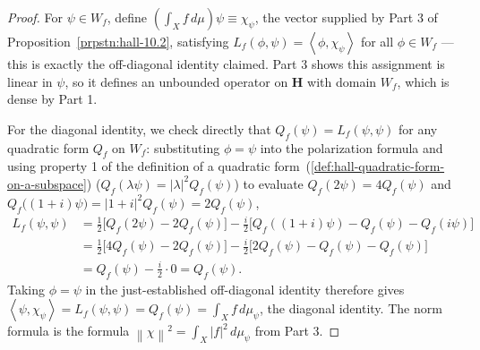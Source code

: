 \begin{proof}
    \leanok
For $\psi \in W_f$, define $\left( \int_X f \, d\mu \right) \psi \equiv \chi_\psi$, the vector supplied by Part 3 of Proposition~\ref{prpstn:hall-10.2}, satisfying $L_f(\phi, \psi) = \left< \phi, \chi_\psi \right>$ for all $\phi \in W_f$ — this is exactly the off-diagonal identity claimed. Part 3 shows this assignment is linear in $\psi$, so it defines an unbounded operator on $\mathbf{H}$ with domain $W_f$, which is dense by Part 1.

For the diagonal identity, we check directly that $Q_f(\psi) = L_f(\psi,\psi)$ for any quadratic form $Q_f$ on $W_f$: substituting $\phi = \psi$ into the polarization formula and using property 1 of the definition of a quadratic form~(\ref{def:hall-quadratic-form-on-a-subspace}) ($Q_f(\lambda\psi) = \lvert\lambda\rvert^2 Q_f(\psi)$) to evaluate $Q_f(2\psi) = 4Q_f(\psi)$ and $Q_f\big((1+i)\psi\big) = \lvert 1+i \rvert^2 Q_f(\psi) = 2Q_f(\psi)$,
\begin{align}
    L_f(\psi,\psi) &= \frac{1}{2}\big[ Q_f(2\psi) - 2Q_f(\psi) \big] - \frac{i}{2}\big[ Q_f((1+i)\psi) - Q_f(\psi) - Q_f(i\psi) \big] \\
                   &= \frac{1}{2}\big[ 4Q_f(\psi) - 2Q_f(\psi) \big] - \frac{i}{2}\big[ 2Q_f(\psi) - Q_f(\psi) - Q_f(\psi) \big] \\
                   &= Q_f(\psi) - \frac{i}{2}\cdot 0 = Q_f(\psi).
\end{align}
Taking $\phi = \psi$ in the just-established off-diagonal identity therefore gives $\left< \psi, \chi_\psi \right> = L_f(\psi,\psi) = Q_f(\psi) = \int_X f \, d\mu_\psi$, the diagonal identity. The norm formula is the formula $\left\| \chi \right\|^2 = \int_X \lvert f \rvert^2 \, d\mu_\psi$ from Part 3.


\end{proof}
